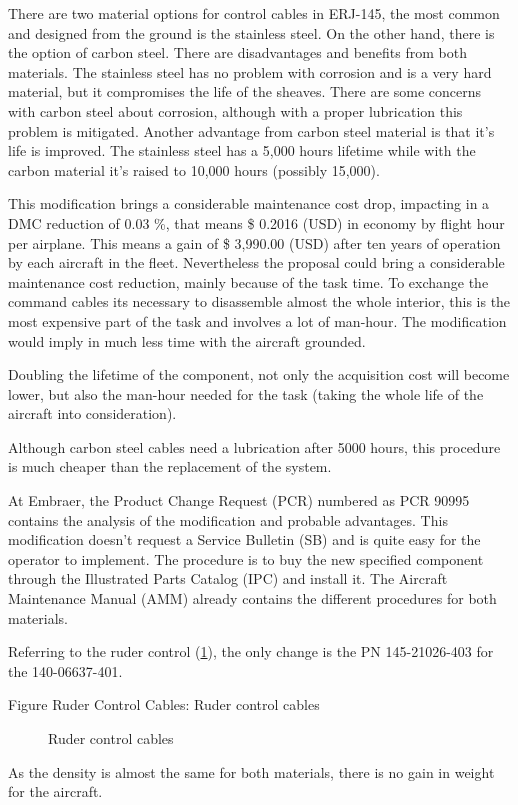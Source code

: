 There are two material options for control cables in ERJ-145, the most common and designed from the ground is the stainless steel. On the other hand, there is the option of carbon steel.
There are disadvantages and benefits from both materials. The stainless steel has no problem with corrosion and is a very hard material, but it compromises the life of the sheaves. There are some concerns with carbon steel about corrosion, although with a proper lubrication this problem is mitigated.
Another advantage from carbon steel material is that it's life is improved. The stainless steel has a 5,000 hours lifetime while with the carbon material it's raised to 10,000 hours (possibly 15,000).

This modification brings a considerable maintenance cost drop, impacting in a DMC reduction of 0.03 \%, that means \$ 0.2016 (USD) in economy by flight hour per airplane. This means a gain of \$ 3,990.00 (USD) after ten years of operation by each aircraft in the fleet. Nevertheless the proposal could bring a considerable maintenance cost reduction, mainly because of the task time. To exchange the command cables its necessary to disassemble almost the whole interior, this is the most expensive part of the task and involves a lot of man-hour. The modification would imply in much less time with the aircraft grounded.

Doubling the lifetime of the component, not only the acquisition cost will become lower, but also the man-hour needed for the task (taking the whole life of the aircraft into consideration).

Although carbon steel cables need a lubrication after 5000 hours, this procedure is much cheaper than the replacement of the system.

At Embraer, the Product Change Request (PCR) numbered as PCR 90995 contains the analysis of the modification and probable advantages. This modification doesn't request a Service Bulletin (SB) and is quite easy for the operator to implement. The procedure is to buy the new specified component through the Illustrated Parts Catalog (IPC) and install it. The Aircraft Maintenance Manual (AMM) already contains the different procedures for both materials.

Referring to the ruder control (\ref{fig:RCC}), the only change is the PN 145-21026-403 for the 140-06637-401.

Figure Ruder Control Cables: Ruder control cables
\begin{figure}[H] %
\caption{Ruder control cables}
\label{fig:RCC}
\end{figure}

As the density is almost the same for both materials, there is no gain in weight for the aircraft.
